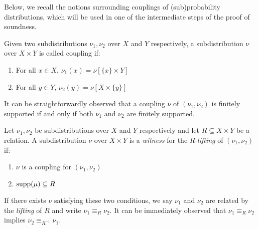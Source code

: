   Below, we recall the notions surrounding couplings of (sub)probability distributions, which will be used in one of the intermediate steps of the proof of soundness.
\begin{definition}\label{def:coupling}
    Given two subdistributions $\nu_1, \nu_2$ over $X$ and $Y$ respectively, a subdistribution $\nu$ over $X \times Y$ is called coupling if:
    \begin{enumerate}
        \item For all $x \in X$, $\nu_1(x) = \nu[\{x\}\times Y]$
        \item For all $y \in Y$, $\nu_2(y)= \nu[X \times \{y\}]$
    \end{enumerate} 
\end{definition}
It can be straightforwardly observed that a coupling $\nu$ of $(\nu_1, \nu_2)$ is finitely supported if and only if both $\nu_1$ and $\nu_2$ are finitely supported.
\begin{definition}\label{def:lifting}
    Let $\nu_1, \nu_2$ be subdistributions over $X$ and $Y$ respectively and let $R \subseteq X \times Y$ be a relation. A subdistribution $\nu$ over $X \times Y$ is a \emph{witness} for the $R$-\emph{lifting} of $(\nu_1, \nu_2)$ if:
    \begin{enumerate}
        \item $\nu$ is a coupling for $(\nu_1, \nu_2)$
        \item $\operatorname{supp}(\mu) \subseteq R$
    \end{enumerate}
\end{definition}
If there exists $\nu$ satisfying these two conditions, we say $\nu_1$ and $\nu_2$ are related by the \emph{lifting} of $R$ and write $\nu_1 \equiv_R \nu_2$. It can be immediately observed that $\nu_1 \equiv_R \nu_2$ implies $\nu_2 \equiv_{R^{-1}} \nu_1$.

